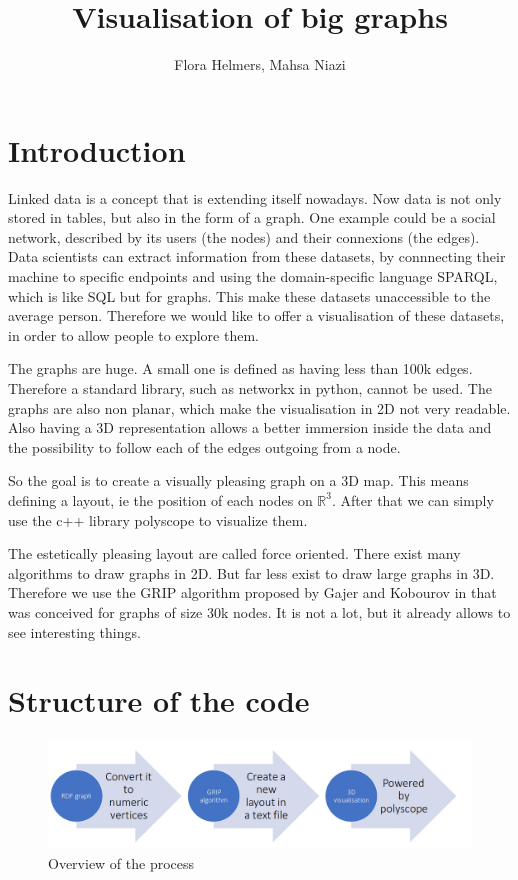\documentclass{article}
\title{Visualisation of big graphs}
\author{Flora Helmers, Mahsa Niazi}
\begin{document}
\maketitle

\section*{Introduction}
Linked data is a concept that is extending itself nowadays. Now data is not only stored in tables, but also in the form of a graph. One example could be a social network, described by its users (the nodes) and their connexions (the edges). Data scientists can extract information from these datasets, by connnecting their machine to specific endpoints and using the domain-specific language SPARQL, which is like SQL but for graphs. This make these datasets unaccessible to the average person. Therefore we would like to offer a visualisation of these datasets, in order to allow people to explore them. 

The graphs are huge. A small one is defined as having less than 100k edges. Therefore a standard library, such as networkx in python, cannot be used.
The graphs are also non planar, which make the visualisation in 2D not very readable. 
Also having a 3D representation allows a better immersion inside the data and the possibility to follow each of the edges outgoing from a node.

So the goal is to create a visually pleasing graph on a 3D map. This means defining a layout, ie the position of each nodes on $\mathbb{R}^3$. After that we can simply use the c++ library polyscope to visualize them. 

The estetically pleasing layout are called force oriented. There exist many algorithms to draw graphs in 2D. But far less exist to draw large graphs in 3D. Therefore we use the GRIP algorithm proposed by Gajer and Kobourov in \cite{gajer00} that was conceived for graphs of size 30k nodes. It is not a lot, but it already allows to see interesting things.


\section{Structure of the code}

\begin{figure}[h!]
    \includegraphics[width=\textwidth]{process.png}
    \caption{Overview of the process}
\end{figure}
\end{document}
